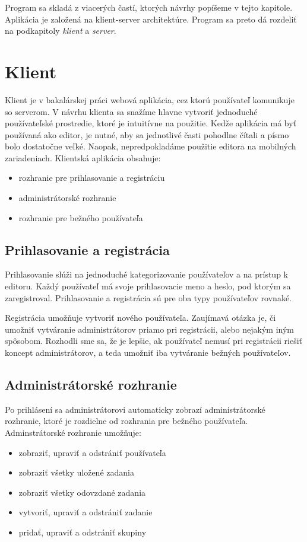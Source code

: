 Program sa skladá z viacerých častí, ktorých návrhy popíšeme v tejto kapitole.
Aplikácia je založená na klient-server architektúre. Program sa preto dá rozdeliť na 
podkapitoly \textit{klient} a \textit{server}.

\section{Klient}
Klient je v bakalárskej práci webová aplikácia, cez ktorú používateľ komunikuje so serverom. V návrhu
klienta sa snažíme hlavne vytvoriť jednoduché používateľské prostredie, ktoré je intuitívne na
použitie. Kedže aplikácia má byť používaná ako editor, je nutné, aby sa jednotlivé časti pohodlne
čítali a písmo bolo dostatočne veľké. Naopak, nepredpokladáme použitie editora na mobilných
zariadeniach. Klientská aplikácia obsahuje:
\begin{itemize}
\item rozhranie pre prihlasovanie a registráciu
\item administrátorské rozhranie
\item rozhranie pre bežného používateľa
\end{itemize}

\subsection{Prihlasovanie a registrácia}
Prihlasovanie slúži na jednoduché kategorizovanie používateľov a na prístup k editoru. Každý
používateľ má svoje prihlasovacie meno a heslo, pod ktorým sa zaregistroval. Prihlasovanie a
registrácia sú pre oba typy používateľov rovnaké.

Registrácia umožňuje vytvoriť nového používateľa. Zaujímavá otázka je, či umožniť vytváranie
administrátorov priamo pri registrácii, alebo nejakým iným spôsobom. Rozhodli sme sa, že je lepšie,
ak používateľ nemusí pri registrácii riešiť koncept administrátorov, a teda umožniť iba vytváranie
bežných používateľov. 

\subsection{Administrátorské rozhranie}
Po prihlásení sa administrátorovi automaticky zobrazí administrátorské rozhranie, ktoré je rozdielne
od rozhrania pre bežného používateľa. Adminstrátorské rozhranie umožňuje:
\begin{itemize}
\item zobraziť, upraviť a odstrániť používateľa
\item zobraziť všetky uložené zadania
\item zobraziť všetky odovzdané zadania
\item vytvoriť, upraviť a odstrániť zadanie
\item pridať, upraviť a odstrániť skupiny
\end{itemize}

